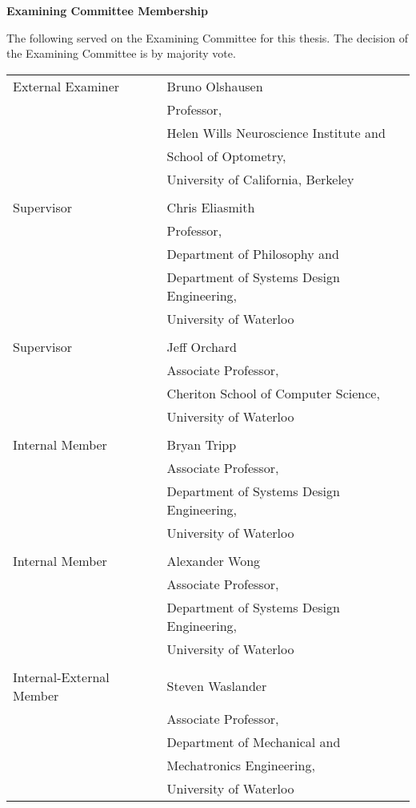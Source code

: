 \pagestyle{plain}
\setcounter{page}{2}

\cleardoublepage


\noindent
\textbf{Examining Committee Membership}

\noindent
The following served on the Examining Committee for this thesis.
The decision of the Examining Committee is by majority vote.

\vspace*{0.5cm}

\noindent
\begin{tabular}{p{2in}l}
External Examiner         & Bruno Olshausen \\
  & Professor,\\
  & Helen Wills Neuroscience Institute and\\
  & School of Optometry,\\
  & University of California, Berkeley\\
\\
Supervisor                & Chris Eliasmith \\
  & Professor,\\
  & Department of Philosophy and\\
  & Department of Systems Design Engineering,\\
  & University of Waterloo\\
\\
Supervisor                & Jeff Orchard \\
  & Associate Professor,\\
  & Cheriton School of Computer Science,\\
  & University of Waterloo\\
\\
Internal Member           & Bryan Tripp \\
  & Associate Professor,\\
  & Department of Systems Design Engineering,\\
  & University of Waterloo\\
\\
Internal Member           & Alexander Wong\\
  & Associate Professor,\\
  & Department of Systems Design Engineering,\\
  & University of Waterloo\\
\\
Internal-External Member  & Steven Waslander\\
  & Associate Professor,\\
  & Department of Mechanical and\\
  & Mechatronics Engineering,\\
  & University of Waterloo\\
\end{tabular}


